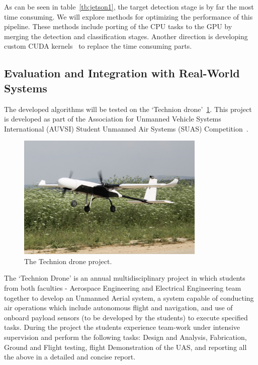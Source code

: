 \documentclass[a4paper]{article} %
\begin{document}
As can be seen in table~\cref{tb:jetson1}, the target detection stage is by far
the most time consuming. We will explore methods for optimizing the performance
of this pipeline. These methods include porting of the CPU tasks to the GPU by
merging the detection and classification stages. Another direction is developing
custom CUDA kernels~\cite{nvidiacuda} to replace the time consuming parts.

\subsection{Evaluation and Integration with Real-World Systems}

The developed algorithms will be tested on the `Technion
drone'~\cref{fig:drone}. This project is developed as part of the Association
for Unmanned Vehicle Systems International (AUVSI) Student Unmanned Air Systems
(SUAS) Competition~\cite{AUVSI_competition}.
\begin{figure}[h]
	\centering
	\includegraphics[width=0.8\textwidth]{drone}
	\caption{The Technion drone project.}
	\label{fig:drone}
\end{figure}
The `Technion Drone' is an annual multidisciplinary project in which students
from both faculties - Aerospace Engineering and Electrical Engineering team
together to develop an Unmanned Aerial system, a system capable of conducting
air operations which include autonomous flight and navigation, and use of
onboard payload sensors (to be developed by the students) to execute specified
tasks. During the project the students experience team-work under intensive
supervision and perform the following tasks: Design and Analysis, Fabrication,
Ground and Flight testing, flight Demonstration of the UAS, and reporting all
the above in a detailed and concise report.
\end{document}
